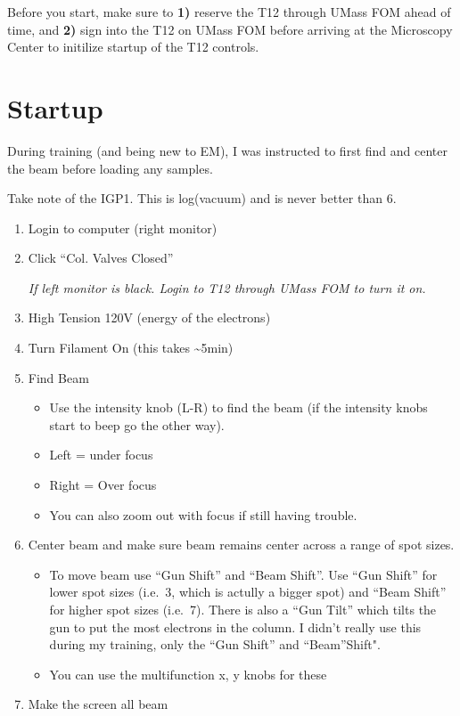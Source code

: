 \documentclass[]{book}
\providecommand{\tightlist}{%
  \setlength{\itemsep}{0pt}\setlength{\parskip}{0pt}}
\begin{document}
Before you start, make sure to \textbf{1)} reserve the T12 through UMass FOM ahead of time, and \textbf{2)} sign into the T12 on UMass FOM before arriving at the Microscopy Center to initilize startup of the T12 controls.

\hypertarget{startup}{%
\chapter{Startup}\label{startup}}

During training (and being new to EM), I was instructed to first find and center the beam before loading any samples.

Take note of the IGP1. This is log(vacuum) and is never better than 6.

\begin{enumerate}
\def\labelenumi{\arabic{enumi})}
\item
  Login to computer (right monitor)
\item
  Click ``Col. Valves Closed''

  \emph{If left monitor is black. Login to T12 through UMass FOM to turn it on.}
\item
  High Tension 120V (energy of the electrons)
\item
  Turn Filament On (this takes \textasciitilde{}5min)
\item
  Find Beam

  \begin{itemize}
  \tightlist
  \item
    Use the intensity knob (L-R) to find the beam (if the intensity knobs start to beep go the other way).
  \item
    Left = under focus
  \item
    Right = Over focus
  \item
    You can also zoom out with focus if still having trouble.
  \end{itemize}
\item
  Center beam and make sure beam remains center across a range of spot sizes.

  \begin{itemize}
  \tightlist
  \item
    To move beam use ``Gun Shift'' and ``Beam Shift''. Use ``Gun Shift'' for lower spot sizes (i.e.~3, which is actully a bigger spot) and ``Beam Shift'' for higher spot sizes (i.e.~7). There is also a ``Gun Tilt'' which tilts the gun to put the most electrons in the column. I didn't really use this during my training, only the ``Gun Shift'' and ``Beam''Shift".
  \item
    You can use the multifunction x, y knobs for these
  \end{itemize}
\item
  Make the screen all beam
\end{enumerate}
\end{document}
